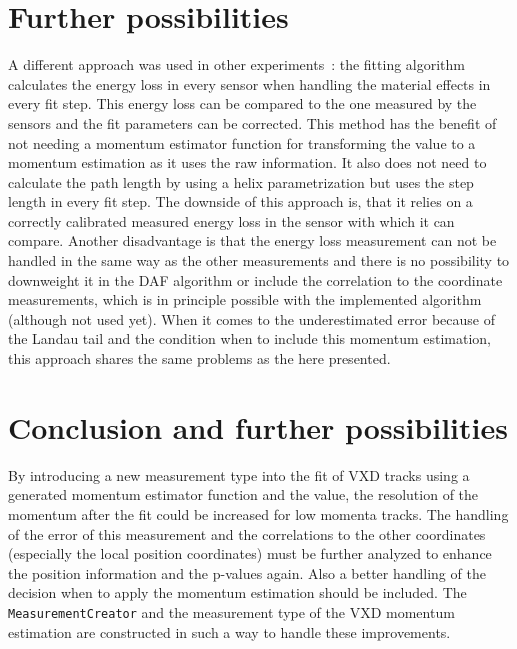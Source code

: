 \section{Further possibilities}

A different approach was used in other experiments~\cite{sergey}: the fitting algorithm calculates the energy loss in every sensor when handling the material effects in every fit step. This energy loss can be compared to the one measured by the sensors and the fit parameters can be corrected. This method has the benefit of not needing a momentum estimator function for transforming the \dedx value to a momentum estimation as it uses the raw \dedx information. It also does not need to calculate the path length by using a helix parametrization but uses the step length in every fit step. The downside of this approach is, that it relies on a correctly calibrated measured energy loss in the sensor with which it can compare. Another disadvantage is that the energy loss measurement can not be handled in the same way as the other measurements and there is no possibility to downweight it in the DAF algorithm or include the correlation to the coordinate measurements, which is in principle possible with the implemented algorithm (although not used yet). When it comes to the underestimated error because of the Landau tail and the condition when to include this momentum estimation, this approach shares the same problems as the here presented.

\section{Conclusion and further possibilities}

By introducing a new measurement type into the fit of VXD tracks using a generated momentum estimator function and the \dedx value, the resolution of the momentum after the fit could be increased for low momenta tracks. The handling of the error of this measurement and the correlations to the other coordinates (especially the local position coordinates) must be further analyzed to enhance the position information and the p-values again. Also a better handling of the decision when to apply the momentum estimation should be included. The \texttt{MeasurementCreator} and the measurement type of the VXD momentum estimation are constructed in such a way to handle these improvements.



